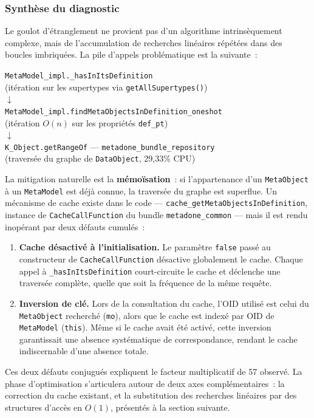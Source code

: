 \subsubsection{Synthèse du diagnostic}

Le goulot d'étranglement ne provient pas d'un algorithme intrinsèquement
complexe, mais de l'accumulation de recherches linéaires répétées dans des
boucles imbriquées.
La pile d'appels problématique est la suivante~:

\begin{center}
\small
\texttt{MetaModel\_impl.\_hasInItsDefinition} \\
(itération sur les supertypes via \texttt{getAllSupertypes()}) \\[4pt]
$\downarrow$ \\[4pt]
\texttt{MetaModel\_impl.findMetaObjectsInDefinition\_oneshot} \\
(itération $O(n)$ sur les propriétés \texttt{def\_pt}) \\[4pt]
$\downarrow$ \\[4pt]
\texttt{K\_Object.getRangeOf} --- \texttt{metadone\_bundle\_repository} \\
(traversée du graphe de \texttt{DataObject}, 29,33\% CPU)
\end{center}

La mitigation naturelle est la \textbf{mémoïsation}~: si l'appartenance
d'un \texttt{MetaObject} à un \texttt{MetaModel} est déjà connue, la
traversée du graphe est superflue. Un mécanisme de cache existe dans le
code --- \texttt{cache\_getMetaObjectsInDefinition}, instance de
\texttt{CacheCallFunction} du bundle \texttt{metadone\_common} --- mais il est rendu inopérant par deux défauts cumulés~:

\begin{enumerate}
    \item \textbf{Cache désactivé à l'initialisation.} Le paramètre
    \texttt{false} passé au constructeur de \texttt{CacheCallFunction}
    désactive globalement le cache. Chaque appel à
    \texttt{\_hasInItsDefinition} court-circuite le cache et déclenche
    une traversée complète, quelle que soit la fréquence de la même
    requête.

    \item \textbf{Inversion de clé.} Lors de la consultation du cache,
    l'OID utilisé est celui du \texttt{MetaObject} recherché (\texttt{mo}),
    alors que le cache est indexé par OID de \texttt{MetaModel}
    (\texttt{this}). Même si le cache avait été activé, cette inversion
    garantissait une absence systématique de correspondance, rendant le
    cache indiscernable d'une absence totale.
\end{enumerate}

Ces deux défauts conjugués expliquent le facteur multiplicatif de 57
observé. La phase d'optimisation s'articulera autour de deux axes
complémentaires~: la correction du cache existant, et la substitution des
recherches linéaires par des structures d'accès en $O(1)$, présentés à la
section suivante.